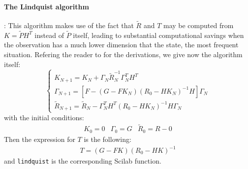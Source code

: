 \paragraph{The Lindquist algorithm} \cite{faurre}:
This algorithm makes use of the fact that 
$\tilde{R}$ and $T$ may be computed from $K=\tilde{P}H^T$ instead 
of $\tilde{P}$ itself, leading to substantial computational
savings when the observation has a much 
lower dimension that the state, the most frequent situation.
Refering the reader to \cite{faurre} for the derivations, we give now 
the algorithm itself: 
\begin{equation}
\left\{ 
\begin{array}{l} 
K_{N+1}=K_N+ \Gamma _N \tilde{R}^{-1}_N \Gamma ^T_N H^T \\
\Gamma_ {N+1}= [F-(G-FK_N)(R_0-HK_N)^{-1}H]\Gamma _N \\
\tilde{R}_{N+1}=\tilde{R}_N-\Gamma ^T_NH^T(R_0-HK_N)^{-1}H\Gamma _N
\label{e.ricc.36}
\end{array}
\right.
\end{equation}
with the initial conditions:
\begin{eqnarray}
K_0=0 & \Gamma _0=G & \tilde{R}_0=R-0
\label{e.ricc.37}
\end{eqnarray}
Then the expression for $T$ is the following:
\begin{eqnarray}
T=(G-FK)(R_0-HK)^{-1}
\label{e.ricc.38}
\end{eqnarray}
and {\tt lindquist} is the corresponding Scilab function.

